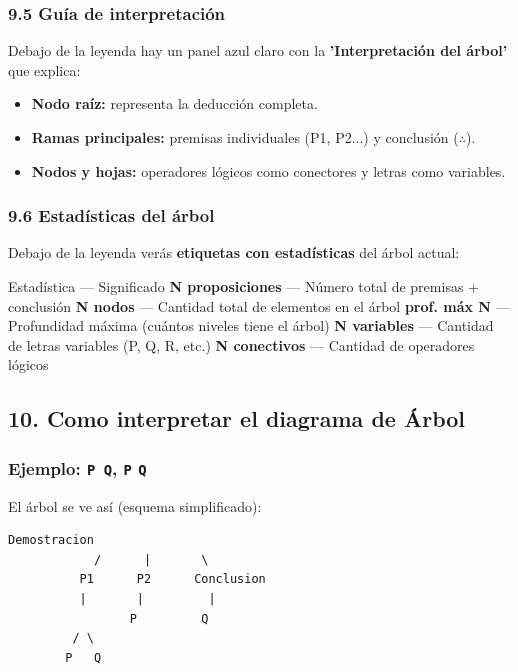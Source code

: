 \documentclass[11pt,a4paper]{article}
\begin{document}
\subsubsection{9.5 Guía de interpretación}

Debajo de la leyenda hay un panel azul claro con la \textbf{'Interpretación del árbol'} que explica:

\begin{itemize}[leftmargin=*]
\item \textbf{Nodo raíz:} representa la deducción completa.
\item \textbf{Ramas principales:} premisas individuales (P1, P2...) y conclusión ($ \therefore $).
\item \textbf{Nodos y hojas:} operadores lógicos como conectores y letras como variables.
\end{itemize}

\subsubsection{9.6 Estadísticas del árbol}

Debajo de la leyenda verás \textbf{etiquetas con estadísticas} del árbol actual:

Estadística --- Significado
\textbf{N proposiciones} --- Número total de premisas + conclusión
\textbf{N nodos} --- Cantidad total de elementos en el árbol
\textbf{prof. máx N} --- Profundidad máxima (cuántos niveles tiene el árbol)
\textbf{N variables} --- Cantidad de letras variables (P, Q, R, etc.)
\textbf{N conectivos} --- Cantidad de operadores lógicos

\hrulefill

\subsection{10. Como interpretar el diagrama de Árbol}

\subsubsection{Ejemplo: \texttt{P  Q}, \texttt{P}  \texttt{Q}}

El árbol se ve así (esquema simplificado):

\begin{lstlisting}[language={},basicstyle=\ttfamily\scriptsize]
              Demostracion
            /      |       \
          P1      P2      Conclusion
          |       |         |
                 P         Q
         / \
        P   Q
\end{lstlisting}
\end{document}
